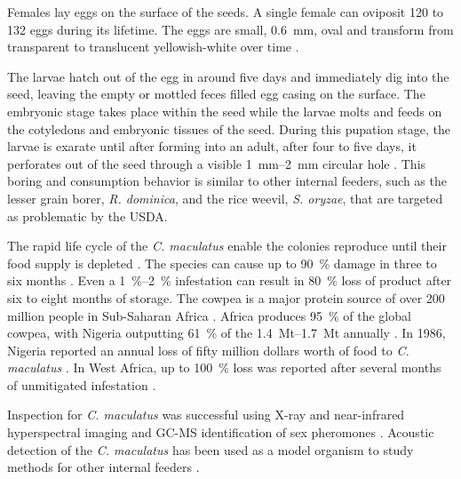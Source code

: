 \documentclass[../Vibro-Acoustic Signatures and Detection Algorithms for Stored Product Insects.tex]{subfiles}
\begin{document}
Females lay eggs on the surface of the seeds. A single female can oviposit 120 to 132 eggs during its lifetime. The eggs are small, \SI{0.6}{\milli\meter}, oval and transform from transparent to translucent yellowish-white over time \cite{katooCallosobruchusMaculatusBiotic2025}.

The larvae hatch out of the egg in around five days and immediately dig into the seed, leaving the empty or mottled feces filled egg casing on the surface. The embryonic stage takes place within the seed while the larvae molts and feeds on the cotyledons and embryonic tissues of the seed. During this pupation stage, the larvae is exarate until after forming into an adult, after four to five days, it perforates out of the seed through a visible \SIrange{1}{2}{\milli\meter} circular hole \cite{beckHandbookBeanBeetles2014,katooCallosobruchusMaculatusBiotic2025}. This boring and consumption behavior is similar to other internal feeders, such as the lesser grain borer, \textit{R. dominica}, and the rice weevil, \textit{S. oryzae}, that are targeted as problematic by the USDA.

The rapid life cycle of the \textit{C. maculatus} enable the colonies reproduce until their food supply is depleted \cite{tranConsequencesInbreedingCowpea1995}. The species can cause up to \SI{90}{\percent} damage in three to six months \cite{agourBrocchiaCinereaDelile2022}. Even a \SIrange{1}{2}{\percent} infestation can result in \SI{80}{\percent} loss of product after six to eight months of storage. The cowpea is a major protein source of over 200 million people in Sub-Saharan Africa \cite{bittnerMonitoringCowpeaBruchid2018}. Africa produces \SI{95}{\percent} of the global cowpea, with Nigeria outputting \SI{61}{\percent} of the \SIrange{1.4}{1.7}{\mega\tonne} annually \cite{bamaiyiEffectCallosobruchusMaculatus2006}. In 1986, Nigeria reported an annual loss of fifty million dollars worth of food to \textit{C. maculatus} \cite{smarttCowpeaResearchProduction1986}. In West Africa, up to \SI{100}{\percent} loss was reported after several months of unmitigated infestation \cite{mohamedn.sallamInsectDamagePostHarvest2013}.

Inspection for \textit{C. maculatus} was successful using X-ray and near-infrared hyperspectral imaging \cite{chelladuraiDetectionCallosobruchusMaculatus2014, divyanthIdentificationGreenGram2022} and GC-MS identification of sex pheromones \cite{kalirameshDetectionInfestationCallosobruchus2013}. Acoustic detection of the \textit{C. maculatus} has been used as a model organism to study methods for other internal feeders \cite{thanthiangaVibrationsMediatePrudent1987, devereauAutomaticRapidScreening2003, njorogeOxygenConsumptionAcoustic2018, bittnerMonitoringCowpeaBruchid2018}.
\end{document}
